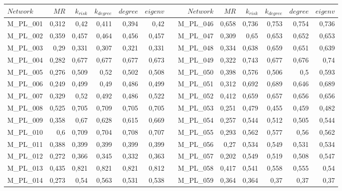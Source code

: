 \begin{table}[hp]
\fontsize{2.8mm}{2.8mm}\selectfont
  \centering
    \begin{adjustbox}{angle=90}
    \begin{tabular}{lrrrrrrrrrrrr}
    \toprule
    $Network$ & $MR$ & $k_{risk}$ & $k_{degree}$ & $degree$ & $eigenv$ &    & $Network$ & $MR$ & $k_{risk}$ & $k_{degree}$ & $degree$ & $eigenv$ \\
    \midrule
       M\_PL\_001 & 0,312 & 0,42 & 0,411 & 0,394 & 0,42 &      & M\_PL\_046 & 0,658 & 0,736 & 0,753 & 0,754 & 0,736 \\
    M\_PL\_002 & 0,359 & 0,457 & 0,464 & 0,456 & 0,457 &      & M\_PL\_047 & 0,309 & 0,65 & 0,653 & 0,652 & 0,653 \\
    M\_PL\_003 & 0,29 & 0,331 & 0,307 & 0,321 & 0,331 &      & M\_PL\_048 & 0,334 & 0,638 & 0,659 & 0,651 & 0,639 \\
    M\_PL\_004 & 0,282 & 0,677 & 0,677 & 0,677 & 0,673 &      & M\_PL\_049 & 0,322 & 0,743 & 0,677 & 0,676 & 0,74 \\
    M\_PL\_005 & 0,276 & 0,509 & 0,52 & 0,502 & 0,508 &      & M\_PL\_050 & 0,398 & 0,576 & 0,506 & 0,5  & 0,593 \\
    M\_PL\_006 & 0,249 & 0,499 & 0,49 & 0,486 & 0,499 &      & M\_PL\_051 & 0,312 & 0,692 & 0,689 & 0,646 & 0,689 \\
    M\_PL\_007 & 0,329 & 0,52 & 0,492 & 0,486 & 0,522 &      & M\_PL\_052 & 0,412 & 0,659 & 0,657 & 0,656 & 0,656 \\
    M\_PL\_008 & 0,525 & 0,705 & 0,709 & 0,705 & 0,705 &      & M\_PL\_053 & 0,251 & 0,479 & 0,455 & 0,459 & 0,482 \\
    M\_PL\_009 & 0,358 & 0,67 & 0,628 & 0,615 & 0,669 &      & M\_PL\_054 & 0,257 & 0,544 & 0,512 & 0,505 & 0,544 \\
    M\_PL\_010 & 0,6  & 0,709 & 0,704 & 0,708 & 0,707 &      & M\_PL\_055 & 0,293 & 0,562 & 0,577 & 0,56 & 0,562 \\
    M\_PL\_011 & 0,388 & 0,399 & 0,399 & 0,399 & 0,399 &      & M\_PL\_056 & 0,27 & 0,534 & 0,549 & 0,531 & 0,534 \\
    M\_PL\_012 & 0,272 & 0,366 & 0,345 & 0,332 & 0,363 &      & M\_PL\_057 & 0,202 & 0,549 & 0,519 & 0,508 & 0,547 \\
    M\_PL\_013 & 0,435 & 0,821 & 0,821 & 0,821 & 0,812 &      & M\_PL\_058 & 0,417 & 0,541 & 0,558 & 0,555 & 0,54 \\
    M\_PL\_014 & 0,273 & 0,54 & 0,563 & 0,531 & 0,538 &      & M\_PL\_059 & 0,364 & 0,364 & 0,37 & 0,37 & 0,37 \\

\end{tabular}
\end{adjustbox}
\end{table}
